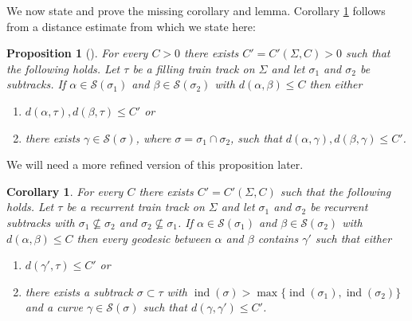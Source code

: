\documentclass[11pt]{article}
\newtheorem{cor}[thm]{Corollary}
\newtheorem{prop}[thm]{Proposition}
\theoremstyle{remark}
\def\S{{\mathcal S}}
\def\ind{\operatorname{ind}}
\begin{document}
We now state and prove the missing corollary and lemma.
Corollary \ref{subtrack distance} follows from a distance estimate from \cite{BB} which we state here:
\begin{prop}[{\cite[Corollary 3.24]{BB}}\label{3.24}]
  For every $C>0$ there exists $C'= C'(\Sigma, C)>0$ such that the following holds.
  Let $\tau$ be a filling train track on $\Sigma$ and let $\sigma_1$ and $\sigma_2$ be subtracks. If $\alpha \in \S(\sigma_1)$ and $\beta\in \S(\sigma_2)$ with $d(\alpha, \beta) \le C$ then either
  \begin{enumerate}[(1)]
    \item $d(\alpha, \tau), d(\beta,\tau) \le C'$ or
    \item there exists $\gamma \in \S(\sigma)$, where $\sigma = \sigma_1 \cap \sigma_2$, such that $d(\alpha, \gamma), d(\beta, \gamma) \le C'$.
  \end{enumerate}
\end{prop}

We will need a more refined version of this proposition later.

\begin{cor}\label{subtrack distance}
 For every $C$ there exists $C'= C'(\Sigma, C)$ such that the
 following holds.  Let $\tau$ be a recurrent train track on $\Sigma$ and let
 $\sigma_1$ and $\sigma_2$ be recurrent subtracks with
 $\sigma_1\not\subseteq\sigma_2$ and $\sigma_2\not\subseteq\sigma_1$. If
 $\alpha \in \S(\sigma_1)$ and $\beta\in \S(\sigma_2)$ with $d(\alpha, \beta) \le C$ then every geodesic between $\alpha$ and $\beta$ contains $\gamma'$ such that
 either
 \begin{enumerate}[(1)]
 \item $d(\gamma', \tau) \le C'$ or
 \item there exists
 a subtrack $\sigma \subset \tau$ with $\ind(\sigma) > \max\{\ind(\sigma_1), \ind(\sigma_2)\}$
and a curve $\gamma \in
 \S(\sigma)$ such that $d(\gamma, \gamma') \le C'$.
\end{enumerate}
\end{cor}
\end{document}
